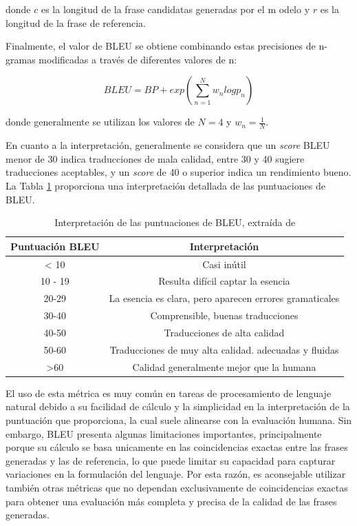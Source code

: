 \documentclass[11pt,spanish,listoffigures,listoftables]{tfgetsinf}
\begin{document}
donde $c$ es la longitud de la frase candidatas generadas por el m odelo y $r$ es la longitud de la frase de referencia.

Finalmente, el valor de BLEU se obtiene combinando estas precisiones de n-gramas modificadas a través de diferentes valores de n:

\begin{equation}
BLEU = BP + exp(\sum_{n = 1}^N w_n log p_n)
\end{equation}

donde generalmente se utilizan los valores de $N = 4$ y $w_n = \frac{1}{N}$.

En cuanto a la interpretación, generalmente se considera que un \textit{score} BLEU menor de 30 indica traducciones de mala calidad, entre 30 y 40 sugiere traducciones aceptables, y un \textit{score} de 40 o superior indica un rendimiento bueno. La Tabla \ref{tab: bleu} proporciona una  interpretación detallada de las puntuaciones de BLEU.

\begin{table}[!h]
\caption{Interpretación de las puntuaciones de BLEU, extraída de \cite{googleTranslate}}
\begin{center}
\begin{tabular}{  c | c  }
	Puntuación BLEU & Interpretación \\
	\hline
	< 10 & Casi inútil \\
	10 - 19 & Resulta difícil captar la esencia \\
	20-29 & La esencia es clara, pero aparecen errores gramaticales \\
	30-40 & Comprensible, buenas traducciones \\
	40-50 & Traducciones de alta calidad \\
	50-60 & Traducciones de muy alta calidad. adecuadas y fluidas \\
	>60 & Calidad generalmente mejor que la humana
\end{tabular}
\end{center}
\label{tab: bleu}
\end{table}

El uso de esta métrica es muy común en tareas de procesamiento de lenguaje natural debido a su facilidad de cálculo y la simplicidad en la interpretación de la puntuación que proporciona, la cual suele alinearse con la evaluación humana. Sin embargo, BLEU presenta algunas limitaciones importantes, principalmente porque su cálculo se basa unicamente en las coincidencias exactas entre las frases generadas y las de referencia, lo que puede limitar su capacidad para capturar variaciones en la formulación del lenguaje. Por esta razón, es aconsejable utilizar también otras métricas que no dependan exclusivamente de coincidencias exactas para obtener una evaluación más completa y precisa de la calidad de las frases generadas.
\end{document}
